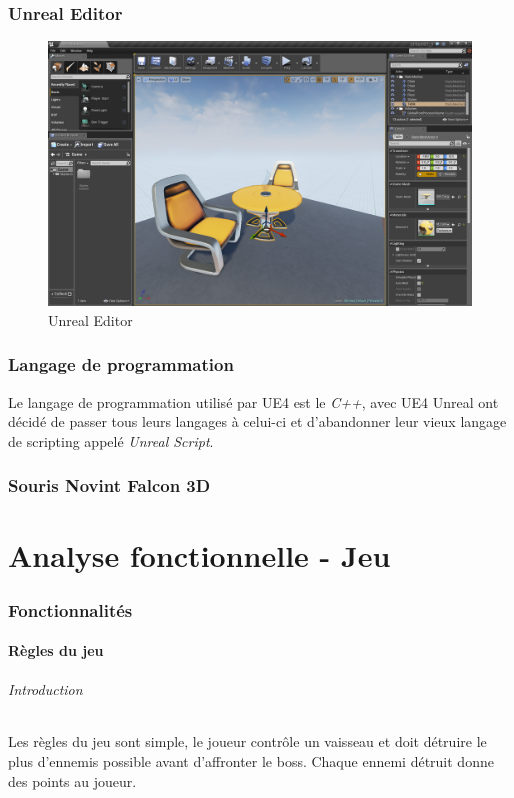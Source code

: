 \documentclass[11pt, a4paper, oneside]{article}
\begin{document}
\section{Unreal Editor}
\begin{center}
\begin{figure}[htp]
\includegraphics[scale=.39]{ue4editor}
\caption{Unreal Editor}
\end{figure}
\end{center}
\section{Langage de programmation}
Le langage de programmation utilisé par UE4 est le \textit{C++}, avec UE4 Unreal ont décidé de passer tous leurs langages à celui-ci et d'abandonner leur vieux langage de scripting appelé \textit{Unreal Script}.
\newpage
\section{Souris Novint Falcon 3D}
\newpage
\part{Analyse fonctionnelle - Jeu}
\section{Fonctionnalités}
\subsection{Règles du jeu}
\paragraph{Introduction}
Les règles du jeu sont simple, le joueur contrôle un vaisseau et doit détruire le plus d'ennemis possible avant d'affronter le boss. Chaque ennemi détruit donne des points au joueur.
\end{document}
